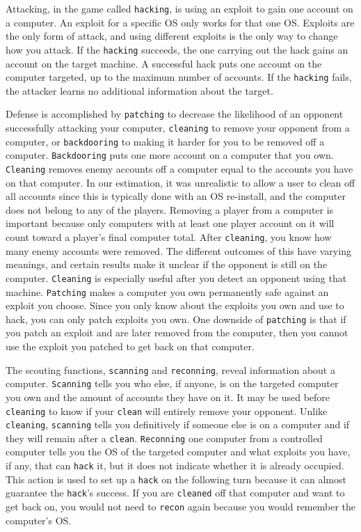 \documentclass{sig-alternate}
\begin{document}
Attacking, in the game called {\tt hacking}, is using an exploit to gain one account on a computer.
An exploit for a specific OS only works for that one OS.  
Exploits are the only form of attack, and using different exploits is the only way to change how you attack. If the {\tt hacking} succeeds, the one carrying out the hack gains an account on the target machine.  
A successful hack puts one account on the computer targeted, up to the maximum number of accounts. 
If the {\tt hacking} fails, the attacker learns no additional information about the target. 

Defense is accomplished by {\tt patching} to decrease the likelihood of an opponent successfully attacking your computer, {\tt cleaning} to remove your opponent from a computer, or {\tt backdooring} to making it harder for you to be removed off a computer. 
{\tt Backdooring} puts one more account on a computer that you own. 
{\tt Cleaning} removes enemy accounts off a computer equal to the accounts you have on that computer.
In our estimation, it was unrealistic to allow a user to clean off all accounts since this is typically done with an OS re-install, and the computer does not belong to any of the players.
Removing a player from a computer is important because only computers with at least one player account on it will count toward a player's final computer total. 
After {\tt cleaning}, you know how many enemy accounts were removed.  
The different outcomes of this have varying meanings, and certain results make it unclear if the opponent is still on the computer. 
{\tt Cleaning} is especially useful after you detect an opponent using that machine.
{\tt Patching} makes a computer you own permanently safe against an exploit you choose. Since you only know about the exploits you own and use to hack, you can only patch exploits you own. 
One downside of {\tt patching} is that if you patch an exploit and are later removed from the computer, then you cannot use the exploit you patched to get back on that computer. 

The scouting functions, {\tt scanning} and {\tt reconning}, reveal information about a computer. {\tt Scanning} tells you who else, if anyone, is on the targeted computer you own and the amount of accounts they have on it.  It may be used before {\tt cleaning} to know if your {\tt clean} will entirely remove your opponent. Unlike {\tt cleaning}, {\tt scanning} tells you definitively if someone else is on a computer and if they will remain after a {\tt clean}.  {\tt Reconning} one computer from a controlled computer tells you the OS of the targeted computer and what exploits you have, if any, that can {\tt hack} it, but it does not indicate whether it is already occupied. This action is used to set up a {\tt hack} on the following turn because it can almost guarantee the {\tt hack}'s success.  If you are {\tt cleaned} off that computer and want to get back on, you would not need to {\tt recon} again because you would remember the computer's OS.
\end{document}
